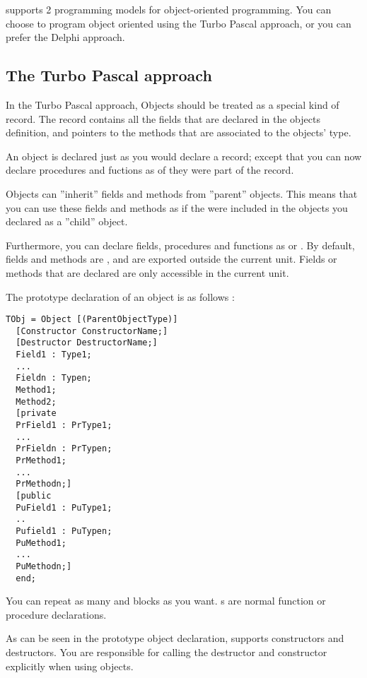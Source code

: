 \documentclass{report}
\begin{document}
\fpc supports 2 programming models for object-oriented programming.
You can choose to program object oriented using the Turbo Pascal approach,
or you can prefer the Delphi approach.

\subsection{The Turbo Pascal approach}
In the Turbo Pascal approach, Objects should be treated as a special kind of
record. The record contains all the fields that are declared in the objects
definition, and pointers to the methods that are associated to the objects'
type.

An object is declared just as you would declare a record; except that you
can now declare procedures and fuctions as of they were part of the record.

Objects can ''inherit'' fields and methods from ''parent'' objects. This means
that you can use these fields and methods as if the were included in the
objects you declared as a ''child'' object. 

Furthermore, you can declare fields, procedures and functions as 
or . By default, fields and methods are , and are
exported outside the current unit. Fields or methods that are declared
 are only accessible in the current unit.

The prototype declaration of an object is as follows :
\begin{verbatim}
TObj = Object [(ParentObjectType)]
  [Constructor ConstructorName;]
  [Destructor DestructorName;]
  Field1 : Type1;
  ...
  Fieldn : Typen;
  Method1;
  Method2;
  [private
  PrField1 : PrType1;
  ...
  PrFieldn : PrTypen;
  PrMethod1;
  ...
  PrMethodn;]
  [public
  PuField1 : PuType1;
  ..
  Pufield1 : PuTypen;
  PuMethod1;
  ...
  PuMethodn;]
  end;
\end{verbatim}
You can repeat as many  and  blocks as you want.
s are normal function or procedure declarations. 

As can be seen in the prototype object declaration, \fpc supports
constructors and destructors. You are responsible for calling the 
destructor and constructor explicitly when using objects.
\end{document}

